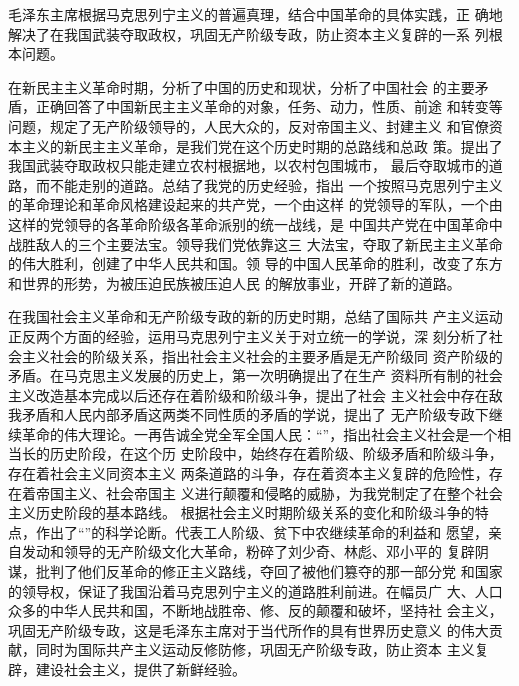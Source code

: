 \begin{hongqiarticle}
  毛泽东主席根据马克思列宁主义的普遍真理，结合中国革命的具体实践，正
  确地解决了在我国武装夺取政权，巩固无产阶级专政，防止资本主义复辟的一系
  列根本问题。

  在新民主主义革命时期，分析了中国的历史和现状，分析了中国社会
  的主要矛盾，正确回答了中国新民主主义革命的对象，任务、动力，性质、前途
  和转变等问题，规定了无产阶级领导的，人民大众的，反对帝国主义、封建主义
  和官僚资本主义的新民主主义革命，是我们党在这个历史时期的总路线和总政
  策。提出了我国武装夺取政权只能走建立农村根据地，以农村包围城市，
  最后夺取城市的道路，而不能走别的道路。总结了我党的历史经验，指出
  一个按照马克思列宁主义的革命理论和革命风格建设起来的共产党，一个由这样
  的党领导的军队，一个由这样的党领导的各革命阶级各革命派别的统一战线，是
  中国共产党在中国革命中战胜敌人的三个主要法宝。领导我们党依靠这三
  大法宝，夺取了新民主主义革命的伟大胜利，创建了中华人民共和国。领
  导的中国人民革命的胜利，改变了东方和世界的形势，为被压迫民族被压迫人民
  的解放事业，开辟了新的道路。

  在我国社会主义革命和无产阶级专政的新的历史时期，总结了国际共
  产主义运动正反两个方面的经验，运用马克思列宁主义关于对立统一的学说，深
  刻分析了社会主义社会的阶级关系，指出社会主义社会的主要矛盾是无产阶级同
  资产阶级的矛盾。在马克思主义发展的历史上，第一次明确提出了在生产
  资料所有制的社会主义改造基本完成以后还存在着阶级和阶级斗争，提出了社会
  主义社会中存在敌我矛盾和人民内部矛盾这两类不同性质的矛盾的学说，提出了
  无产阶级专政下继续革命的伟大理论。一再告诚全党全军全国人民：“”，指出社会主义社会是一个相当长的历史阶段，在这个历
  史阶段中，始终存在着阶级、阶级矛盾和阶级斗争，存在着社会主义同资本主义
  两条道路的斗争，存在着资本主义复辟的危险性，存在着帝国主义、社会帝国主
  义进行颠覆和侵略的威胁，为我党制定了在整个社会主义历史阶段的基本路线。
  根据社会主义时期阶级关系的变化和阶级斗争的特点，作出了“”的科学论断。代表工人阶级、贫下中农继续革命的利益和
  愿望，亲自发动和领导的无产阶级文化大革命，粉碎了刘少奇、林彪、邓小平的
  复辟阴谋，批判了他们反革命的修正主义路线，夺回了被他们篡夺的那一部分党
  和国家的领导权，保证了我国沿着马克思列宁主义的道路胜利前进。在幅员广
  大、人口众多的中华人民共和国，不断地战胜帝、修、反的颠覆和破坏，坚持社
  会主义，巩固无产阶级专政，这是毛泽东主席对于当代所作的具有世界历史意义
  的伟大贡献，同时为国际共产主义运动反修防修，巩固无产阶级专政，防止资本
  主义复辟，建设社会主义，提供了新鲜经验。


\end{hongqiarticle}
